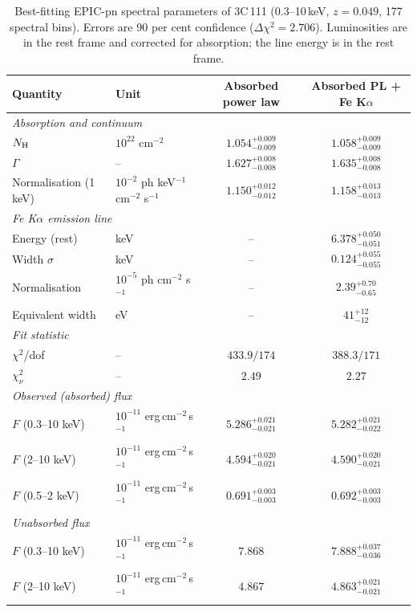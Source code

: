 \documentclass[11pt,a4paper]{article}
\newcommand{\nh}{N_{\rm H}}
\newcommand{\cgs}{erg\,cm$^{-2}$\,s$^{-1}$}
\begin{document}
\begin{table}[H]
\centering
\caption{Best-fitting EPIC-pn spectral parameters of 3C\,111 (0.3--10\,keV, $z=0.049$, 177 spectral bins). Errors are 90 per cent confidence ($\Delta\chi^2=2.706$). Luminosities are in the rest frame and corrected for absorption; the line energy is in the rest frame.}
\label{tab:fit}
\small
\begin{tabular}{llcc}
\toprule
Quantity & Unit & Absorbed power law & Absorbed PL + Fe K$\alpha$ \\
\midrule
\multicolumn{4}{l}{\textit{Absorption and continuum}}\\
$\nh$ & $10^{22}$ cm$^{-2}$ & $1.054^{+0.009}_{-0.009}$ & $1.058^{+0.009}_{-0.009}$ \\
$\Gamma$ & -- & $1.627^{+0.008}_{-0.008}$ & $1.635^{+0.008}_{-0.008}$ \\
Normalisation (1 keV) & $10^{-2}$ ph keV$^{-1}$ cm$^{-2}$ s$^{-1}$ & $1.150^{+0.012}_{-0.012}$ & $1.158^{+0.013}_{-0.013}$ \\[3pt]
\multicolumn{4}{l}{\textit{Fe K$\alpha$ emission line}}\\
Energy (rest) & keV & -- & $6.378^{+0.050}_{-0.051}$ \\
Width $\sigma$ & keV & -- & $0.124^{+0.055}_{-0.055}$ \\
Normalisation & $10^{-5}$ ph cm$^{-2}$ s$^{-1}$ & -- & $2.39^{+0.70}_{-0.65}$ \\
Equivalent width & eV & -- & $41^{+12}_{-12}$ \\[3pt]
\multicolumn{4}{l}{\textit{Fit statistic}}\\
$\chi^2$/dof & -- & $433.9/174$ & $388.3/171$ \\
$\chi^2_\nu$ & -- & $2.49$ & $2.27$ \\[3pt]
\multicolumn{4}{l}{\textit{Observed (absorbed) flux}}\\
$F$ (0.3--10 keV) & $10^{-11}$ \cgs & $5.286^{+0.021}_{-0.021}$ & $5.282^{+0.021}_{-0.022}$ \\
$F$ (2--10 keV) & $10^{-11}$ \cgs & $4.594^{+0.020}_{-0.021}$ & $4.590^{+0.020}_{-0.021}$ \\
$F$ (0.5--2 keV) & $10^{-11}$ \cgs & $0.691^{+0.003}_{-0.003}$ & $0.692^{+0.003}_{-0.003}$ \\[3pt]
\multicolumn{4}{l}{\textit{Unabsorbed flux}}\\
$F$ (0.3--10 keV) & $10^{-11}$ \cgs & $7.868$ & $7.888^{+0.037}_{-0.036}$ \\
$F$ (2--10 keV) & $10^{-11}$ \cgs & $4.867$ & $4.863^{+0.021}_{-0.021}$ \\[3pt]

\end{tabular}
\end{table}
\end{document}
